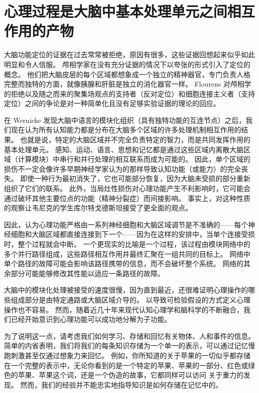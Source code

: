 \section{心理过程是大脑中基本处理单元之间相互作用的产物}

大脑功能定位的证据在过去常常被拒绝，原因有很多，这些证据回想起来似乎如此明显和令人信服。 
颅相学家在没有充分证据的情况下以夸张的形式引入了定位的概念。 
他们把大脑皮层的每个区域都想象成一个独立的精神器官，专门负责人格完整而独特的方面，就像胰腺和肝脏是独立的消化器官一样。 
Flourens 对颅相学的拒绝以及随之而来的聚集场观点的支持者（反对定位）和细胞连接主义者（支持定位）之间的争论是对一种简单化且没有足够实验证据的理论的回应。


在 Wernicke 发现大脑中语言的模块化组织（具有独特功能的互连节点）之后，我们现在认为所有认知能力都是分布在大脑多个区域的许多处理机制相互作用的结果。 
也就是说，特定的大脑区域并不完全负责特定的智力，而是共同发挥作用的基本处理单元。 
感知、运动、语言、思想和记忆都是通过这些区域内离散大脑区域（计算模块）中串行和并行处理的相互联系而成为可能的。 
因此，单个区域的损伤不一定会像许多早期神经学家认为的那样导致认知功能（或能力）的完全丧失。 
即使一种行为最初消失了，它也可能部分恢复，因为大脑未受损的部分重新组织了它们的联系。 
此外，当局灶性损伤对心理功能产生不利影响时，它可能会通过破坏其他主要位点的功能（精神分裂症）而间接影响。 
事实上，对这种性质的观察让韦尼克的学生库尔特戈德斯坦接受了更全面的观点。


因此，认为心理功能严格由一系列神经细胞和大脑区域调节是不准确的——每个神经细胞和大脑区域都直接连接到下一个——因为在这样的安排中，当单个连接受损时，整个过程就会中断。 
一个更现实的比喻是一个过程，该过程由模块网络中的多个并行路径组成，这些路径相互作用并最终汇聚在一组共同的目标上。 
网络中单个路径的故障可能会影响该路径携带的信息，而不会破坏整个系统。 
网络的其余部分可能能够修改其性能以适应一条路径的故障。


大脑中的模块化处理被接受的速度很慢，因为直到最近，还很难证明心理操作的哪些组成部分是由特定通路或大脑区域介导的。 
以导致可检验假设的方式定义心理操作也不容易。 
然而，随着近几十年来现代认知心理学和脑科学的不断融合，我们已经开始意识到心理功能可以成功地分解为子功能。


为了说明这一点，请考虑我们如何学习、存储和回忆有关物体、人和事件的信息。 
简单的内省表明，我们将我们的每条知识存储为一个单一的表示，可以通过记忆慢跑刺激甚至仅通过想象力来回忆。 
例如，你所知道的关于苹果的一切似乎都存储在一个完整的表示中，无论你看到的是一个特定的苹果、苹果的一部分、红色或绿色的苹果、苹果这个词，还是一个伪造的故事，它都同样可以访问 关于重力的发现。 
然而，我们的经验并不能忠实地指导知识是如何存储在记忆中的。


